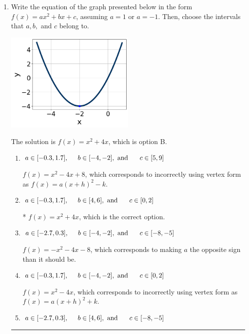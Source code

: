 \documentclass{extbook}[14pt]
\newcommand{\litem}[1]{\item #1

\rule{\textwidth}{0.4pt}}
\begin{document}
\begin{enumerate}\litem{
Write the equation of the graph presented below in the form $f(x)=ax^2+bx+c$, assuming  $a=1$ or $a=-1$. Then, choose the intervals that $a, b,$ and $c$ belong to.

\begin{center}
    \includegraphics[width=0.5\textwidth]{../Figures/quadraticGraphToEquationCopyC.png}
\end{center}



The solution is \( f(x) = x^{2} +4 x \), which is option B.\begin{enumerate}[label=\Alph*.]
\item \( a \in [-0.3, 1.7], \hspace*{5mm} b \in [-4, -2], \text{ and } \hspace*{5mm} c \in [5, 9] \)

$f(x)=x^{2} -4 x + 8$, which corresponds to incorrectly using vertex form as $f(x) = a(x+h)^2 - k$.
\item \( a \in [-0.3, 1.7], \hspace*{5mm} b \in [4, 6], \text{ and } \hspace*{5mm} c \in [0, 2] \)

* $f(x)=x^{2} +4 x$, which is the correct option.
\item \( a \in [-2.7, 0.3], \hspace*{5mm} b \in [-4, -2], \text{ and } \hspace*{5mm} c \in [-8, -5] \)

$f(x)=-x^{2} -4 x -8$, which corresponds to making $a$ the opposite sign than it should be.
\item \( a \in [-0.3, 1.7], \hspace*{5mm} b \in [-4, -2], \text{ and } \hspace*{5mm} c \in [0, 2] \)

$f(x)=x^{2} -4 x$, which corresponds to incorrectly using vertex form as $f(x) = a(x+h)^2+k$.
\item \( a \in [-2.7, 0.3], \hspace*{5mm} b \in [4, 6], \text{ and } \hspace*{5mm} c \in [-8, -5] \)


\end{enumerate}}
\end{enumerate}
\end{document}

